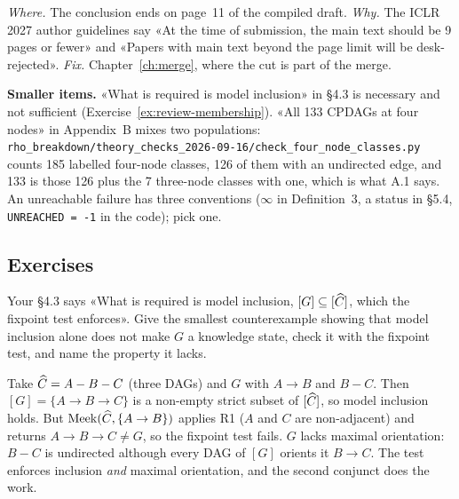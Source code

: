 \emph{Where.} The conclusion ends on page~11 of the compiled draft. \emph{Why.} The ICLR 2027 author
guidelines say «At the time of submission, the main text should be 9 pages or fewer» and «Papers with main
text beyond the page limit will be desk-rejected». \emph{Fix.} Chapter~\ref{ch:merge}, where the cut is part
of the merge.

\textbf{Smaller items.} «What is required is model inclusion» in \S4.3 is necessary and not sufficient
(Exercise~\ref{ex:review-membership}). «All 133 CPDAGs at four nodes» in Appendix~B mixes two populations:
\texttt{rho\_breakdown/\allowbreak theory\_checks\_2026-09-16/\allowbreak check\_four\_node\_classes.py} counts 185 labelled
four-node classes, 126 of them with an undirected edge, and 133 is those 126 plus the 7 three-node classes
with one, which is what A.1 says. An unreachable failure has three conventions ($\infty$ in Definition~3, a
status in \S5.4, \mbox{\texttt{UNREACHED = -1}} in the code); pick one.


\subsection*{Exercises}

\begin{exercicio}[metodo=counterexample,conceito=espaco]
\label{ex:review-membership}
Your \S4.3 says «What is required is model inclusion, $[G] \subseteq [\widehat{C}]$, which the fixpoint test
enforces». Give the smallest counterexample showing that model inclusion alone does not make $G$ a knowledge
state, check it with the fixpoint test, and name the property it lacks.
\end{exercicio}
\begin{solucao}
Take $\widehat{C} = A - B - C$ (three DAGs) and $G$ with $A\to B$ and $B - C$. Then $[G] = \{A\to B\to C\}$ is a
non-empty strict subset of $[\widehat{C}]$, so model inclusion holds. But $\mathrm{Meek}(\widehat{C}, \{A\to B\})$
applies R1 ($A$ and $C$ are non-adjacent) and returns $A\to B\to C \ne G$, so the fixpoint test fails. $G$
lacks maximal orientation: $B - C$ is undirected although every DAG of $[G]$ orients it $B\to C$. The test
enforces inclusion \emph{and} maximal orientation, and the second conjunct does the work.
\end{solucao}

